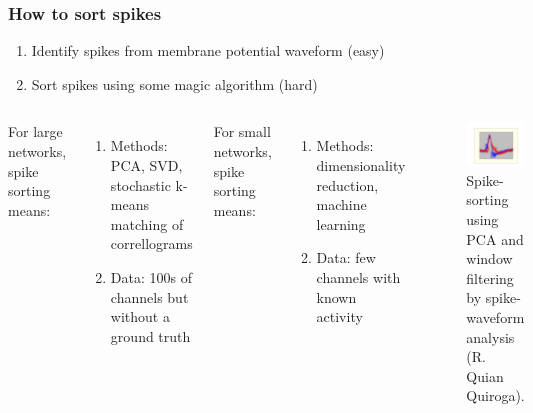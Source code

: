 \documentclass{beamer}
\begin{document}
\begin{frame}
  \frametitle{How to sort spikes}

  \begin{enumerate}
    \item Identify spikes from membrane potential waveform (easy)
    \item Sort spikes using some magic algorithm (hard)
  \end{enumerate}

  \medskip

  \begin{columns}

    For large networks, spike sorting means:

    \begin{enumerate}
      \item Methods: PCA, SVD, stochastic k-means matching of correllograms
      \item Data: 100s of channels but without a ground truth
    \end{enumerate}

    \medskip

    For small networks, spike sorting means:

    \begin{enumerate}
      \item Methods: dimensionality reduction, machine learning
      \item Data: few channels with known activity
    \end{enumerate}


    \begin{figure}
      \includegraphics[width=\textwidth]{gfx/spike-sorting.jpeg}
      \centering
      \caption{Spike-sorting using PCA and window filtering by spike-waveform analysis (R. Quian Quiroga).}
      \label{fig:spikesorting}
    \end{figure}

  \end{columns}

\end{frame}
\end{document}
